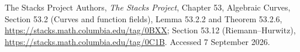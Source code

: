 The Stacks Project Authors,
\emph{The Stacks Project}, Chapter 53, Algebraic Curves,
Section 53.2 (Curves and function fields), Lemma 53.2.2 and
Theorem 53.2.6, \url{https://stacks.math.columbia.edu/tag/0BXX};
Section 53.12 (Riemann--Hurwitz),
\url{https://stacks.math.columbia.edu/tag/0C1B}.
Accessed 7 September 2026.
